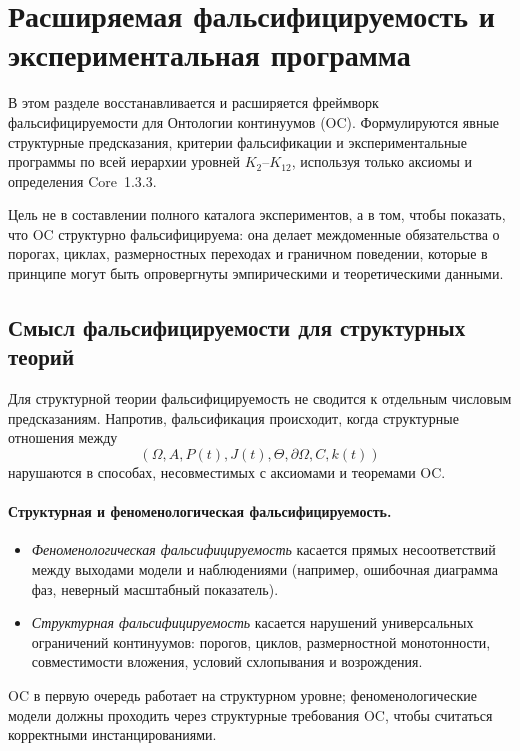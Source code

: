 
\section{Расширяемая фальсифицируемость и экспериментальная программа}
\label{sec:falsifiability-extended}

В этом разделе восстанавливается и расширяется фреймворк фальсифицируемости
для Онтологии континуумов (OC). Формулируются явные структурные
предсказания, критерии фальсификации и экспериментальные программы по всей
иерархии уровней \(K_2\)–\(K_{12}\), используя только аксиомы и
определения Core~1.3.3.

Цель не в составлении полного каталога экспериментов, а в том, чтобы показать,
что OC структурно фальсифицируема: она делает междоменные обязательства
о порогах, циклах, размерностных переходах и граничном поведении, которые
в принципе могут быть опровергнуты эмпирическими и теоретическими данными.

\subsection{Смысл фальсифицируемости для структурных теорий}

Для структурной теории фальсифицируемость не сводится к отдельным числовым
предсказаниям. Напротив, фальсификация происходит, когда структурные
отношения между
\[
  (\Omega, A, P(t), J(t),
   \Theta, \partial\Omega, C, k(t))
\]
нарушаются в способах, несовместимых с аксиомами и теоремами OC.

\paragraph{Структурная и феноменологическая фальсифицируемость.}
\begin{itemize}
  \item \emph{Феноменологическая фальсифицируемость} касается прямых
        несоответствий между выходами модели и наблюдениями (например,
        ошибочная диаграмма фаз, неверный масштабный показатель).
  \item \emph{Структурная фальсифицируемость} касается нарушений
        универсальных ограничений континуумов: порогов, циклов,
        размерностной монотонности, совместимости вложения, условий
        схлопывания и возрождения.
\end{itemize}
OC в первую очередь работает на структурном уровне; феноменологические модели
должны проходить через структурные требования OC, чтобы считаться корректными
инстанцированиями.


